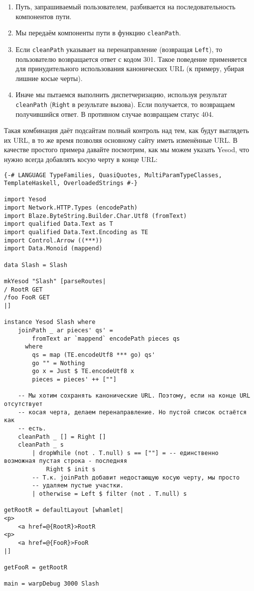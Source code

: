 \begin{enumerate}
  \item Путь, запрашиваемый пользователем, разбивается на последовательность компонентов пути.
  \item Мы передаём компоненты пути в функцию \lstinline!cleanPath!.
  \item Если \lstinline!cleanPath! указывает на перенаправление (возвращая \lstinline!Left!), то пользователю возвращается ответ с кодом 301. Такое поведение применяется для принудительного использования канонических URL (к примеру, убирая лишние косые черты).
  \item Иначе мы пытаемся выполнить диспетчеризацию, используя результат \lstinline!cleanPath! (\lstinline!Right! в результате вызова). Если получается, то возвращаем получившийся ответ. В противном случае возвращаем статус 404.
\end{enumerate}

Такая комбинация даёт подсайтам полный контроль над тем, как будут выглядеть их URL, в то же время позволяя основному сайту иметь изменённые URL. В качестве простого примера давайте посмотрим, как мы можем указать Yesod, что нужно всегда добавлять косую черту в конце URL:

\begin{lstlisting}
{-# LANGUAGE TypeFamilies, QuasiQuotes, MultiParamTypeClasses, TemplateHaskell, OverloadedStrings #-}

import Yesod
import Network.HTTP.Types (encodePath)
import Blaze.ByteString.Builder.Char.Utf8 (fromText)
import qualified Data.Text as T
import qualified Data.Text.Encoding as TE
import Control.Arrow ((***))
import Data.Monoid (mappend)

data Slash = Slash

mkYesod "Slash" [parseRoutes|
/ RootR GET
/foo FooR GET
|]

instance Yesod Slash where
    joinPath _ ar pieces' qs' =
        fromText ar `mappend` encodePath pieces qs
      where
        qs = map (TE.encodeUtf8 *** go) qs'
        go "" = Nothing
        go x = Just $ TE.encodeUtf8 x
        pieces = pieces' ++ [""]

    -- Мы хотим сохранять канонические URL. Поэтому, если на конце URL отсутствует
    -- косая черта, делаем перенаправление. Но пустой список остаётся как
    -- есть.
    cleanPath _ [] = Right []
    cleanPath _ s
        | dropWhile (not . T.null) s == [""] = -- единственно возможная пустая строка - последняя
            Right $ init s
        -- Т.к. joinPath добавит недостающую косую черту, мы просто
        -- удаляем пустые участки.
        | otherwise = Left $ filter (not . T.null) s

getRootR = defaultLayout [whamlet|
<p>
    <a href=@{RootR}>RootR
<p>
    <a href=@{FooR}>FooR
|]

getFooR = getRootR

main = warpDebug 3000 Slash
\end{lstlisting}%

